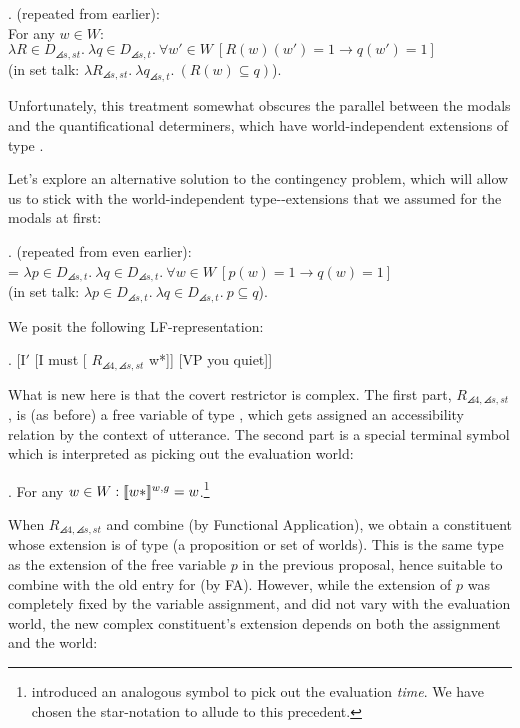 \ex. (repeated from earlier):\\
For any $w \in W$: \\
$\lambda R\in D_{\angles{s,st}}.\ \lambda q\in D_{\angles{s,t}}.\ \forall w'\in W\ [R(w)(w') =1 \rightarrow q(w')=1]$\\
\null\hfill(in set talk: $\lambda R_{\angles{s,st}}.\ \lambda q_{\angles{s,t}}.\ (R(w)\ensuremath{\subseteq}q)$).

Unfortunately, this treatment somewhat obscures the parallel between
the modals and the quantificational determiners, which have
world-independent extensions of type .

Let's explore an alternative solution to the contingency problem,
which will allow us to stick with the world-independent
type--extensions that we assumed for the
modals at first:

\ex. (repeated from even earlier): \\
 = $\lambda p\in D_{\angles{s,t}}.\ \lambda q\in D_{\angles{s,t}}.\ \forall w\in W\ [p(w)=1 \rightarrow q(w)=1]$\\
\null\hfill(in set talk: $\lambda p \in D_{\angles{s,t}}.\ \lambda q \in D_{\angles{s,t}}.\ p \ensuremath{\subseteq} q$).

We posit the following LF-representation:

\exi. \label{brandlf} [I$'$ [I must [ $R_{\angles{4,\angles{s,st}}}$ w*]] [VP you quiet]]

What is new here is that the covert restrictor is complex. The first
part, $R_{\angles{4,\angles{s,st}}}$, is (as before) a free variable
of type , which gets assigned an accessibility relation
by the context of utterance. %
%
The second part is a special terminal symbol which is interpreted as
picking out the evaluation world:

\ex. For any $w\in W: \llbracket w* \rrbracket^{w,g} = w$.\footnote{\citet{dowty:1982:time-adverbs} introduced an analogous symbol to pick out the evaluation \emph{time}. We have chosen the star-notation to allude to this precedent.}

When $R_{\angles{4,\angles{s,st}}}$ and  combine (by
Functional Application), we obtain a constituent whose extension is of
type  (a proposition or set of worlds). This is the same
type as the extension of the free variable $p$ in the previous
proposal, hence suitable to combine with the old entry for
 (by FA). However, while the extension of $p$ was
completely fixed by the variable assignment, and did not vary with the
evaluation world, the new complex constituent's extension depends on
both the assignment and the world:

